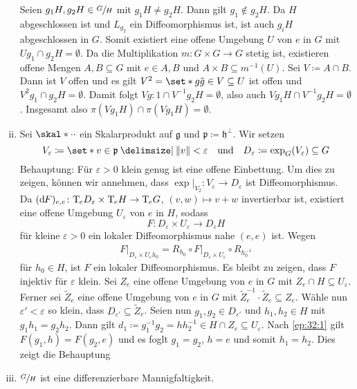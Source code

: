 \begin{beweis}
\begin{enumerate}[(i)]
		Seien $g_1 H, g_2 H \in \sfrac{G}{H}$ mit $g_1 H \neq g_2 H$.
		Dann gilt $g_1 \notin g_2 H$.
		Da $H$ abgeschlossen ist und $L_{g_2}$ ein Diffeomorphismus ist, ist auch $g_i H$ abgeschlossen in $G$.
		Somit existiert eine offene Umgebung $U$ von $e$ in $G$ mit $U g_1 \cap g_2 H = \emptyset$.
		Da die Multiplikation $m \colon G \times G \to G$ stetig ist, existieren offene Mengen $A,B \subseteq G$ mit $e \in A,B$ und $A \times B \subseteq m^{-1}(U)$.
		Sei $V \coloneqq A \cap B$.
		Dann ist $V$ offen und es gilt $V^2= \set*{g \tilde{g} \in V} \subseteq U$ ist offen und $V^2 g_1 \cap g_2 H = \emptyset$.
		Damit folgt $V g:1 \cap V^{-1} g_2 H = \emptyset$, also auch $V g_1 H \cap V^{-1} g_2 H = \emptyset$.
		Insgesamt also $\pi(V g_1 H) \cap \pi(V g_1 H) = \emptyset$.
		\item Sei $\skal*{\cdot }{\cdot }$ ein Skalarprodukt auf $\mathfrak{g}$ und $\mathfrak{p} \coloneqq \mathfrak{h}^\bot$.
		Wir setzen 
		\[
			V_\varepsilon \coloneqq \set*{v \in \mathfrak{p} \given \norm*{v} < \varepsilon} \quad \text{und} \quad D_\varepsilon \coloneqq \exp_G(V_\varepsilon) \subseteq G 
		\] 
		Behauptung: Für $\varepsilon>0$ klein genug ist 
		eine offene Einbettung. 
		Um dies zu zeigen, können wir annehmen, dass $\exp|_{V_2} \colon V_\varepsilon \to D_\varepsilon$ ist Diffeomorphismus.
		Da $(\mathrm{d}\mkern-1.0mu F)_{e,e} \colon \mathrm{T}\mkern-0.85mu_e D_\varepsilon \times \mathrm{T}\mkern-0.85mu_e H \to \mathrm{T}\mkern-0.85mu_e G$, $(v,w) \mapsto v+w$ invertierbar ist, existiert eine offene Umgebung $U_\varepsilon$ von $e$ in $H$, sodass 
		\begin{equation}
			F \colon D_\varepsilon \times U_\varepsilon \to D_\varepsilon H \label{ep:32:1}\tag{*}
		\end{equation}
		für kleine $\varepsilon>0$ ein lokaler Diffeomorphismus nahe $(e,e)$ ist.
		Wegen
		\begin{align}
			F\big|_{D_\varepsilon \times U_\varepsilon h_0} = R_{h_0} \circ F\big|_{D_\varepsilon \times U_\varepsilon} \circ R_{h_0^{-1}}
		\end{align}
		für $h_0 \in H$, ist $F$ ein lokaler Diffeomorphismus.
		Es bleibt zu zeigen, dass $F$ injektiv für $\varepsilon$ klein.
		Sei $Z_e$ eine offene Umgebung von $e$ in $G$ mit $Z_e \cap H \subseteq U_\varepsilon$.
		Ferner sei $\tilde{Z}_e$ eine offene Umgebung von $e$ in $G$ mit $\tilde{Z}_e^{-1} \cdot \tilde{Z}_e \subseteq Z_e$.
		Wähle nun $\varepsilon' < \varepsilon$ so klein, dass $D_{\varepsilon'} \subseteq \tilde{Z}_e$.
		Seien nun $g_1, g_2 \in D_{\varepsilon'}$ und $h_1,h_2 \in H$ mit $g_1 h_1 = g_2 h_2$.
		Dann gilt $d_1 \coloneqq g_1^{-1} g_2 = h h_2^{-1} \in H \cap Z_e \subseteq U_\varepsilon$.
		Nach \eqref{ep:32:1} gilt $F(g_1,h) = F(g_2,e)$ und es foglt $g_1 =g_2$, $h=e$ und somit $h_1 =h_2$.
		Dies zeigt die Behauptung
		\item $\sfrac{G}{H}$ ist eine differenzierbare Mannigfaltigkeit.
		

\end{enumerate}
\end{beweis}
